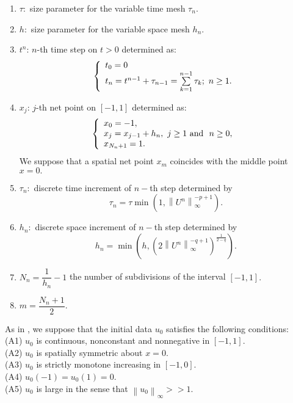 \documentclass[a4paper,12pt,english,reqno]{smfart}
\begin{document}
	\begin{enumerate}
		\item $\tau: $ size parameter for the variable time mesh $\tau_{n}$.
		\item $h: $ size parameter for the variable space mesh $h_{n}$.	 
		\item $t^{n}$: $n$-th time step on $t>0$ determined as:	
		\begin{equation*}
		\left\{
		\begin{array}{lll}
		t_{0}=0\\
		t_{n}=t^{n-1}+\tau_{n-1}=\sum\limits_{k=1}^{n-1}{\tau_{k}}; \ n\geq 1.\\	
		\end{array}
		\right.\\
		\end{equation*}	
		\item $x_{j}$: $j$-th net point on $[-1,1]$ determined as:
		\begin{equation*}
		\left\{ 
		\begin{array}{lll}
		x_{0}=-1,\\
		x_{j}=x_{j-1}+h_{n},\  j\geq 1 \text{ and }\  n\geq 0,\\
		x_{N_{n}+1}=1.
		\end{array}
		\right.\\
	    \end{equation*}
		We suppose that a spatial net point $x_{m}$ coincides with the middle point $x=0.$
		\item $\tau_{n}: $ discrete time increment  of $n-$th step determined by
		\begin{equation*}
		\tau_{n}=\tau \min\left(1,\left\|U^{n}\right\|_{\infty}^{-p+1}\right).
		\end{equation*} 
		\item $h_{n}: $ discrete space increment of $n-$th step determined by $$h_{n}=
		\min\left(h,\left(2\left\|U^{n}\right\|_{\infty}^{-q+1}\right)^{\frac{1}{2-q}}\right).$$ 
		\item $N_{n}=\dfrac{1}{h_{n}}-1$ the number of subdivisions of the interval $[-1,1].$
		\item $m=\dfrac{N_{n}+1}{2}.$
	\end{enumerate}
	As in \cite{hani}, we suppose that the initial data $u_{0}$ satisfies the following conditions:\\
	(A1) $u_{0}$ is continuous, nonconstant and nonnegative in $[-1,1].$\\
	(A2) $u_{0}$ is spatially symmetric about $x=0.$\\
	(A3) $u_{0}$ is strictly monotone increasing in $[-1,0].$\\
	(A4) $u_{0}(-1)=u_{0}(1)=0.$\\
	(A5) $u_{0}$ is large in the sense that $\left\|u_{0}\right\|_{\infty}>>1.$\\
	
\end{document}
